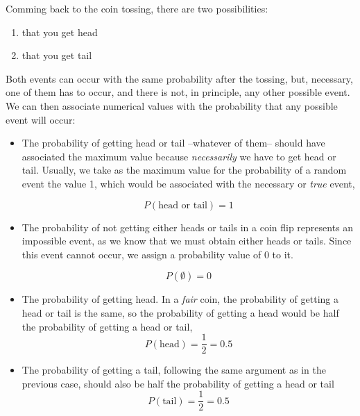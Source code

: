 \begin{paracol}{2}
Comming back to the coin tossing, there are two possibilities:
\begin{enumerate}
\item that you get head
\item that you get tail
\end{enumerate} 

Both events can occur with the same probability after the tossing, but, necessary, one of them has to occur, and there is not, in principle, any other possible event. We can then associate numerical values with the probability that any possible event will occur:

\begin{itemize}
	\item The probability of getting head or tail --whatever of them-- should have associated the maximum value because \emph{necessarily} we have to get head or tail. Usually, we take as the maximum value for the probability of a random event the value 1, which would be associated with the necessary or \emph{true} event,
	
\begin{equation*}
	P(\text{head or tail}) = 1
\end{equation*}

\item The probability of not getting either heads or tails in a coin flip represents an impossible event, as we know that we must obtain either heads or tails. Since this event cannot occur, we assign a probability value of 0 to it.

\begin{equation*}
	P(\emptyset) = 0
\end{equation*}

\item The probability of getting head. In a \emph{fair} coin, the probability of getting a head or tail is the same, so the probability of getting a head would be half the probability of getting a head or tail,
\begin{equation*}
	P(\text{head})=\frac{1}{2}=0.5
\end{equation*}

\item The probability of getting a tail, following the same argument as in the previous case, should also be half the probability of getting a head or tail
\begin{equation*}
	P(\text{tail})=\frac{1}{2}=0.5
\end{equation*} 
\end{itemize} 

\end{paracol}

